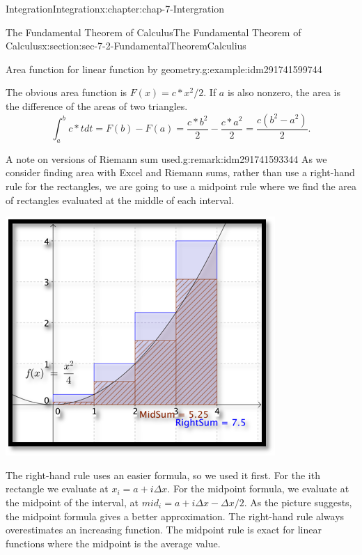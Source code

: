 \documentclass[oneside,10pt,]{book}
\numberwithin{equation}{section}
\begin{document}
\begin{chapterptx}{Integration}{}{Integration}{}{}{x:chapter:chap-7-Intergration}
\begin{sectionptx}{The Fundamental Theorem of Calculus}{}{The Fundamental Theorem of Calculus}{}{}{x:section:sec-7-2-FundamentalTheoremCalculius}
\begin{example}{Area function for linear function by geometry.}{g:example:idm291741599744}
\begin{sidebyside}{1}{0.2}{0.2}{0}
\end{sidebyside}%
\par
The obvious area function is \(F(x)=c*x^2/2\).  If \(a\) is also nonzero, the area is the difference of the areas of two triangles.%
%
\begin{equation*}
\int_a^b c*t dt=F(b)-F(a)=
\frac{c*b^2}{2}-\frac{c*a^2}{2}=\frac{c (b^2-a^2 )}{2}.
\end{equation*}
\end{example}
\begin{remark}{A note on versions of Riemann sum used.}{g:remark:idm291741593344}%
As we consider finding area with Excel and Riemann sums, rather than use a right-hand rule for the rectangles, we are going to use a midpoint rule where we find the area of rectangles evaluated at the middle of each interval.%
\begin{sidebyside}{1}{0.2}{0.2}{0}%
\begin{sbspanel}{0.6}%
\includegraphics[width=\linewidth]{images/sec7-2-3.png}
\end{sbspanel}%
\end{sidebyside}%
\par
The right-hand rule uses an easier formula, so we used it first.  For the ith rectangle we evaluate at \(x_i=a+i\Delta x\).  For the midpoint formula, we evaluate at the midpoint of the interval, at \(mid_i=a+i\Delta x-\Delta x/2\).  As the picture suggests, the midpoint formula gives a better approximation.  The right-hand rule always overestimates an increasing function.  The midpoint rule is exact for linear functions where the midpoint is the average value.%

\end{remark}
\end{sectionptx}
\end{chapterptx}
\end{document}
